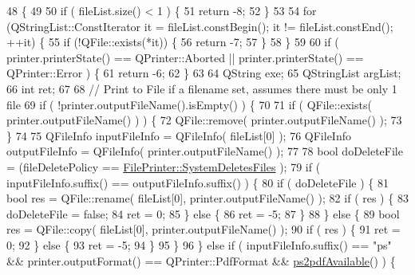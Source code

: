 \begin{DoxyCode}
48 \{
49 
50     \textcolor{keywordflow}{if} ( fileList.size() < 1 ) \{
51         \textcolor{keywordflow}{return} -8;
52     \}
53 
54     \textcolor{keywordflow}{for} (QStringList::ConstIterator it = fileList.constBegin(); it != fileList.constEnd(); ++it) \{
55         \textcolor{keywordflow}{if} (!QFile::exists(*it)) \{
56             \textcolor{keywordflow}{return} -7;
57         \}
58     \}
59 
60     \textcolor{keywordflow}{if} ( printer.printerState() == QPrinter::Aborted || printer.printerState() == QPrinter::Error ) \{
61         \textcolor{keywordflow}{return} -6;
62     \}
63 
64     QString exe;
65     QStringList argList;
66     \textcolor{keywordtype}{int} ret;
67 
68     \textcolor{comment}{// Print to File if a filename set, assumes there must be only 1 file}
69     \textcolor{keywordflow}{if} ( !printer.outputFileName().isEmpty() ) \{
70 
71         \textcolor{keywordflow}{if} ( QFile::exists( printer.outputFileName() ) ) \{
72             QFile::remove( printer.outputFileName() );
73         \}
74 
75         QFileInfo inputFileInfo = QFileInfo( fileList[0] );
76         QFileInfo outputFileInfo = QFileInfo( printer.outputFileName() );
77 
78         \textcolor{keywordtype}{bool} doDeleteFile = (fileDeletePolicy == \hyperlink{classOkular_1_1FilePrinter_acd01eb48e99f9289a7f4786a366ef7baa86d9b928c2434b89a15de26c8cc22705}{FilePrinter::SystemDeletesFiles}
      );
79         \textcolor{keywordflow}{if} ( inputFileInfo.suffix() == outputFileInfo.suffix() ) \{
80             \textcolor{keywordflow}{if} ( doDeleteFile ) \{
81                 \textcolor{keywordtype}{bool} res = QFile::rename( fileList[0], printer.outputFileName() );
82                 \textcolor{keywordflow}{if} ( res ) \{
83                     doDeleteFile = \textcolor{keyword}{false};
84                     ret = 0;
85                 \} \textcolor{keywordflow}{else} \{
86                     ret = -5;
87                 \}
88             \} \textcolor{keywordflow}{else} \{
89                 \textcolor{keywordtype}{bool} res = QFile::copy( fileList[0], printer.outputFileName() );
90                 \textcolor{keywordflow}{if} ( res ) \{
91                     ret = 0;
92                 \} \textcolor{keywordflow}{else} \{
93                     ret = -5;
94                 \}
95             \}
96         \} \textcolor{keywordflow}{else} \textcolor{keywordflow}{if} ( inputFileInfo.suffix() == \textcolor{stringliteral}{"ps"} && printer.outputFormat() == QPrinter::PdfFormat && 
      \hyperlink{classOkular_1_1FilePrinter_a047b30a135796c064fda2823ae6c0ddb}{ps2pdfAvailable}() ) \{

\end{DoxyCode}
